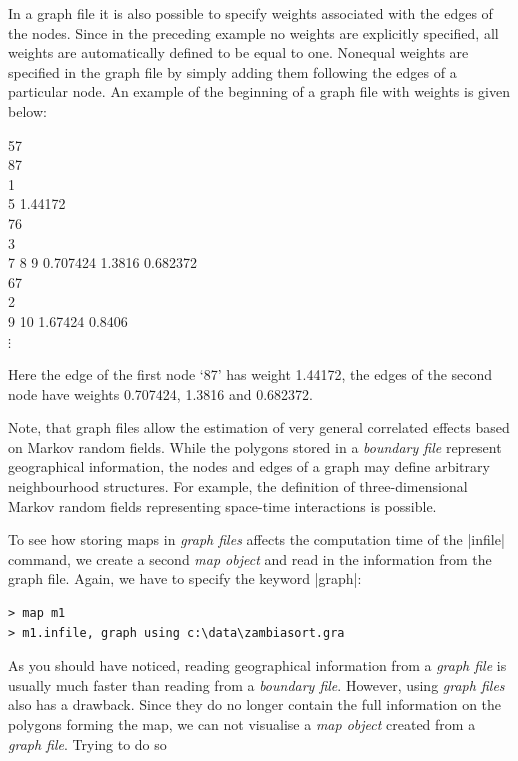 In a graph file it is also possible to specify weights associated with the edges of the nodes. Since in the preceding example
no weights are explicitly specified, all weights are automatically defined to be equal to one. Nonequal weights are specified
in the graph file by simply adding them following the edges of a particular node. An example of the beginning of a graph file
with weights is given below:

\footnotesize

 57\\
 87\\
 1\\
 5 1.44172\\
 76\\
 3\\
 7 8 9 0.707424 1.3816 0.682372\\
 67\\
 2\\
 9 10 1.67424 0.8406\\

\hspace{1cm} $\vdots$

\normalsize

\vspace{0.5cm}

Here the edge of the first node `87' has weight 1.44172, the edges of the second node have weights 0.707424, 1.3816 and
0.682372.

Note, that graph files allow the estimation of very general correlated effects based on Markov random fields. While the
polygons stored in a {\it boundary file} represent geographical information, the nodes and edges of a graph may define
arbitrary neighbourhood structures. For example, the definition of three-dimensional Markov random fields representing
space-time interactions is possible.

To see how storing maps in {\it graph files} affects the computation time of the |infile| command, we create a second {\it map
object} and read in the information from the graph file. Again, we have to specify the keyword |graph|:

\begin{verbatim}
> map m1
> m1.infile, graph using c:\data\zambiasort.gra
\end{verbatim}

As you should have noticed, reading geographical information from a {\it graph file} is usually much faster than reading from a
{\it boundary file}. However, using {\it graph files} also has a drawback. Since they do no longer contain the full information
on the polygons forming the map, we can not visualise a {\it map object} created from a {\it graph file}. Trying to do so

